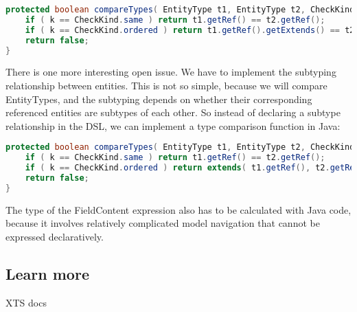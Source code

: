 \begin{lstlisting}[language=Java]
protected boolean compareTypes( EntityType t1, EntityType t2, CheckKind k, TypeCalculationTrace trace ) {
    if ( k == CheckKind.same ) return t1.getRef() == t2.getRef();
    if ( k == CheckKind.ordered ) return t1.getRef().getExtends() == t2.getRef();
    return false;
}
\end{lstlisting}


There is one more interesting open issue. We have to implement the subtyping
relationship between entities. This is not so simple, because we will compare 
EntityTypes, and the subtyping depends on whether their corresponding referenced
entities are subtypes of each other. So instead of declaring a subtype relationship
in the DSL, we can implement a type comparison function in Java:

\begin{lstlisting}[language=Java]
protected boolean compareTypes( EntityType t1, EntityType t2, CheckKind k, TypeCalculationTrace trace ) {
    if ( k == CheckKind.same ) return t1.getRef() == t2.getRef();
    if ( k == CheckKind.ordered ) return extends( t1.getRef(), t2.getRef() );
    return false; 
}
\end{lstlisting}








The type of the FieldContent expression also has to be calculated with Java
code, because it involves relatively complicated model navigation that cannot be
expressed declaratively.








\subsection{Learn more}

XTS docs
  